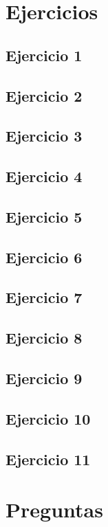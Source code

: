 \documentclass{aitemplate}
\begin{document}
\section{Ejercicios}\subsection*{Ejercicio 1}
\newpage\subsection*{Ejercicio 2}
\newpage\subsection*{Ejercicio 3}
\newpage\subsection*{Ejercicio 4}
\newpage\subsection*{Ejercicio 5}
\newpage\subsection*{Ejercicio 6}
\newpage\subsection*{Ejercicio 7}
\newpage\subsection*{Ejercicio 8}
\newpage\subsection*{Ejercicio 9}
\newpage\subsection*{Ejercicio 10}
\newpage\subsection*{Ejercicio 11}
\newpage\section{Preguntas}
\end{document}
